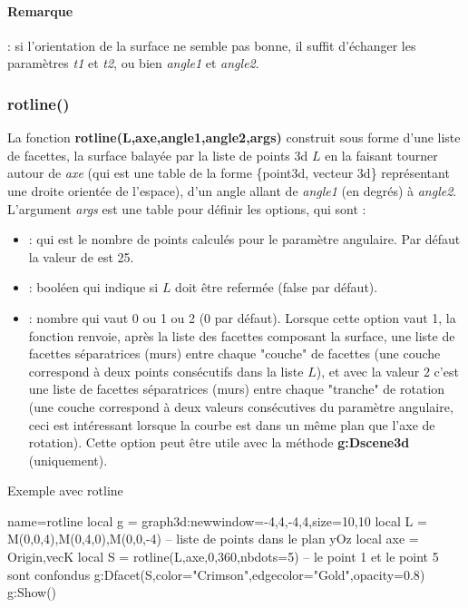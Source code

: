 \paragraph{Remarque} : si l'orientation de la surface ne semble pas bonne, il suffit d'échanger les paramètres \emph{t1} et \emph{t2}, ou bien \emph{angle1} et \emph{angle2}.

\subsubsection{rotline()}

La fonction \textbf{rotline(L,axe,angle1,angle2,args)} construit sous forme d'une liste de facettes, la surface balayée par la liste de points 3d $L$ en la faisant tourner autour de \emph{axe} (qui est une table de la forme \{point3d, vecteur 3d\} représentant une droite orientée de l'espace), d'un angle allant de \emph{angle1} (en degrés) à \emph{angle2}. L'argument \emph{args} est une table pour définir les options, qui sont :
    \begin{itemize}
        \item {} : qui est le nombre de points calculés pour le paramètre angulaire. Par défaut la valeur de  est 25.
        
        \item {} : booléen qui indique si $L$ doit être refermée (false par défaut).

        \item {} : nombre qui vaut 0 ou 1 ou 2 (0 par défaut). Lorsque cette option vaut 1, la fonction renvoie, après la liste des facettes composant la surface, une liste de facettes séparatrices (murs) entre chaque "couche" de facettes (une couche correspond à deux points consécutifs dans la liste $L$), et avec la valeur 2 c'est une liste de facettes séparatrices (murs) entre chaque "tranche" de rotation (une couche correspond à deux valeurs consécutives du paramètre angulaire, ceci est intéressant lorsque la courbe est dans un même plan que l'axe de rotation). Cette option peut être utile avec la méthode \textbf{g:Dscene3d} (uniquement).
        \end{itemize} 
\begin{demo}{Exemple avec rotline}
\begin{luadraw}{name=rotline}
local g = graph3d:new{window={-4,4,-4,4},size={10,10}}
local L = {M(0,0,4),M(0,4,0),M(0,0,-4)} -- liste de points dans le plan yOz
local axe = {Origin,vecK}
local S = rotline(L,axe,0,360,{nbdots=5}) -- le point 1 et le point 5 sont confondus
g:Dfacet(S,{color="Crimson",edgecolor="Gold",opacity=0.8})
g:Show()
\end{luadraw}
\end{demo}      


